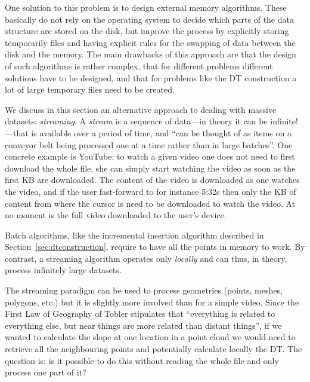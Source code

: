 %

One solution to this problem is to design external memory algorithms.%
These basically do not rely on the operating system to decide which parts of the data structure are stored on the disk, but improve the process by explicitly storing temporarily files and having explicit rules for the swapping of data between the disk and the memory. 
The main drawbacks of this approach are that the design of such algorithms is rather complex, that for different problems different solutions have to be designed, and that for problems like the DT construction a lot of large temporary files need to be created.

%

We discuss in this section an alternative approach to dealing with massive datasets: \emph{streaming}.%
A \emph{stream} 
is a sequence of data---in theory it can be infinite!---that is available over a period of time, and ``can be thought of as items on a conveyor belt being processed one at a time rather than in large batches''.
One concrete example is YouTube: to watch a given video one does not need to first download the whole file, she can simply start watching the video as soon as the first KB are downloaded.
The content of the video is downloaded as one watches the video, and if the user fast-forward to for instance 5:32s then only the KB of content from where the cursor is need to be downloaded to watch the video.
At no moment is the full video downloaded to the user's device.

%

Batch algorithms, like the incremental insertion algorithm described in Section~\ref{sec:dtconstruction},%
require to have all the points in memory to work.
By contrast, a streaming algorithm operates only \emph{locally} and can thus, in theory, process infinitely large datasets.

%

The streaming paradigm can be used to process geometries (points, meshes, polygons, etc.) but it is slightly more involved than for a simple video.
Since the First Law of Geography of Tobler stipulates that ``everything is related to everything else, but near things are more related than distant things'', if we wanted to calculate the slope at one location in a point cloud we would need to retrieve all the neighbouring points and potentially calculate locally the DT\@.
The question is: is it possible to do this without reading the whole file and only process one part of it?

